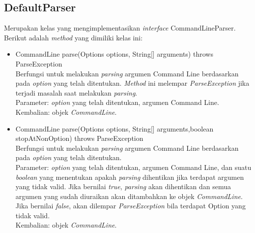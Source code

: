 \subsection{DefaultParser}
\label{subsec:defaultparser}
Merupakan kelas yang mengimplementasikan \textit{interface} CommandLineParser. Berikut adalah \textit{method} yang dimiliki kelas ini:
\begin{itemize}
\item CommandLine parse(Options options, String[] arguments) throws ParseException\\
Berfungsi untuk melakukan \textit{parsing} argumen Command Line berdasarkan pada \textit{option} yang telah ditentukan. \textit{Method} ini melempar \textit{ParseException} jika terjadi masalah saat melakukan \textit{parsing}.\\
Parameter: \textit{option} yang telah ditentukan, argumen Command Line.\\
Kembalian: objek \textit{CommandLine}.

\item CommandLine parse(Options options, String[] arguments,boolean stopAtNonOption) throws ParseException\\
Berfungsi untuk melakukan \textit{parsing} argumen Command Line berdasarkan pada \textit{option} yang telah ditentukan.\\
Parameter: \textit{option} yang telah ditentukan, argumen Command Line, dan suatu \textit{boolean} yang menentukan apakah \textit{parsing} dihentikan jika terdapat argumen yang tidak valid. Jika bernilai \textit{true}, \textit{parsing} akan dihentikan dan semua argumen yang sudah diuraikan akan ditambahkan ke objek \textit{CommandLine}. Jika bernilai \textit{false}, akan dilempar \textit{ParseException} bila terdapat Option yang tidak valid.\\
Kembalian: objek \textit{CommandLine}.
\end{itemize}

